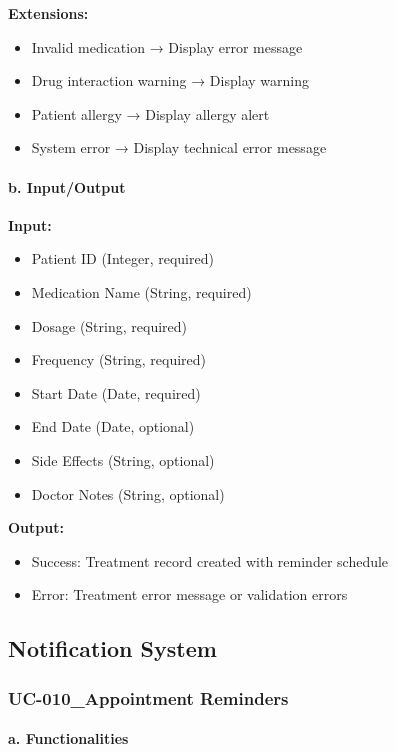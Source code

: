 \documentclass[12pt,a4paper]{article}
\begin{document}
\textbf{Extensions:}
\begin{itemize}
    \item Invalid medication → Display error message
    \item Drug interaction warning → Display warning
    \item Patient allergy → Display allergy alert
    \item System error → Display technical error message
\end{itemize}

\paragraph{b. Input/Output}

\textbf{Input:}
\begin{itemize}
    \item Patient ID (Integer, required)
    \item Medication Name (String, required)
    \item Dosage (String, required)
    \item Frequency (String, required)
    \item Start Date (Date, required)
    \item End Date (Date, optional)
    \item Side Effects (String, optional)
    \item Doctor Notes (String, optional)
\end{itemize}

\textbf{Output:}
\begin{itemize}
    \item Success: Treatment record created with reminder schedule
    \item Error: Treatment error message or validation errors
\end{itemize}

\subsection{Notification System}

\subsubsection{UC-010\_Appointment Reminders}

\paragraph{a. Functionalities}
\end{document}
